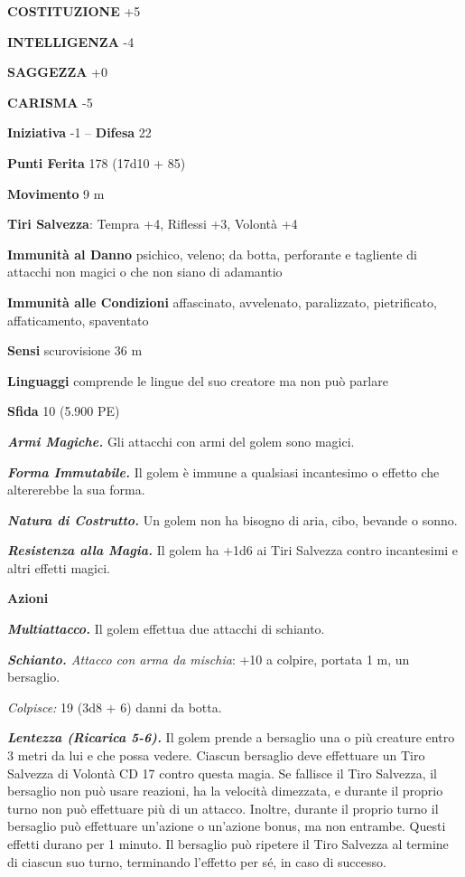 \begin{multicols}{2}
\textbf{COSTITUZIONE} +5

\textbf{INTELLIGENZA} -4

\textbf{SAGGEZZA} +0

\textbf{CARISMA} -5

\textbf{Iniziativa} -1 -- \textbf{Difesa} 22

\textbf{Punti Ferita} 178 (17d10 + 85)

\textbf{Movimento} 9 m

\textbf{Tiri Salvezza}: Tempra +4, Riflessi +3, Volontà +4

\textbf{Immunità al Danno} psichico, veleno; da botta, perforante e tagliente di attacchi non magici o che non siano di adamantio

\textbf{Immunità alle Condizioni} affascinato, avvelenato, paralizzato, pietrificato, affaticamento, spaventato

\textbf{Sensi} scurovisione 36 m

\textbf{Linguaggi} comprende le lingue del suo creatore ma non può parlare

\textbf{Sfida} 10 (5.900 PE)

\emph{\textbf{Armi Magiche.}} Gli attacchi con armi del golem sono magici.

\emph{\textbf{Forma Immutabile.}} Il golem è immune a qualsiasi incantesimo o effetto che altererebbe la sua forma.

\emph{\textbf{Natura di Costrutto.}} Un golem non ha bisogno di aria, cibo, bevande o sonno.

\emph{\textbf{Resistenza alla Magia.}} Il golem ha +1d6 ai Tiri Salvezza contro incantesimi e altri effetti magici.

\textbf{Azioni}

\emph{\textbf{Multiattacco.}} Il golem effettua due attacchi di schianto.

\emph{\textbf{Schianto.} Attacco con arma da mischia}: +10 a colpire, portata 1 m, un bersaglio.

\emph{Colpisce:} 19 (3d8 + 6) danni da botta.

\emph{\textbf{Lentezza (Ricarica 5-6).}} Il golem prende a bersaglio una o più creature entro 3 metri da lui e che possa vedere. Ciascun bersaglio deve effettuare un Tiro Salvezza di Volontà CD 17 contro questa magia. Se fallisce il Tiro Salvezza, il bersaglio non può usare reazioni, ha la velocità dimezzata, e durante il proprio turno non può effettuare più di un attacco. Inoltre, durante il proprio turno il bersaglio può effettuare un'azione o un'azione bonus, ma non entrambe. Questi effetti durano per 1 minuto. Il bersaglio può ripetere il Tiro Salvezza al termine di ciascun suo turno, terminando l'effetto per sé, in caso di successo.


\end{multicols}
